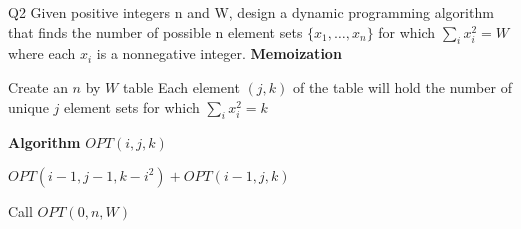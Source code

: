 \begin{problem}
  {Q2}
  Given positive integers n and W, design a dynamic programming algorithm that finds
  the number of possible n element sets $\{x_1, \dots , x_n\}$ for which $\sum_i x_i^2 = W$ where each
  $x_i$ is a nonnegative integer.
  \noindent
  \textbf{Memoization}
  \begin{algorithmic}[1]
    \STATE Create an $n$ by $W$ table
    \STATE Each element $(j, k)$ of the table will hold the number of unique $j$ element sets for which $\sum_i x_i^2 = k$
  \end{algorithmic}
  \textbf{Algorithm}
  $OPT(i, j, k)$
  \begin{algorithmic}[1]
    \ENDIF
    \RETURN $OPT(i-1, j-1, k-i^2) + OPT(i-1, j, k)$
  \end{algorithmic}
  Call $OPT(0, n, W)$
\end{problem}
